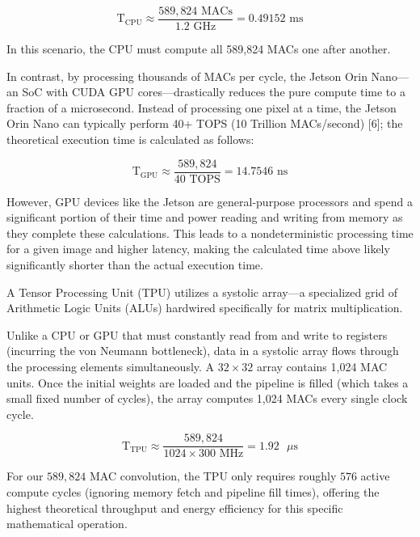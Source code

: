 \documentclass[11pt,a4paper,twoside]{article}
\begin{document}
\begin{equation}
\text{T}_{\text{CPU}} \approx \frac{589,824 \text{ MACs}}{1.2 \text{ GHz}} = 0.49152 \text{ ms}
\end{equation}

In this scenario, the CPU must compute all 589,824 MACs one after another.

In contrast, by processing thousands of MACs per cycle, the Jetson Orin Nano—an SoC with CUDA GPU cores—drastically reduces the pure compute time to a fraction of a microsecond. Instead of processing one pixel at a time, the Jetson Orin Nano can typically perform 40+ TOPS (10 Trillion MACs/second) [6]; the theoretical execution time is calculated as follows:

\begin{equation}
\text{T}_{\text{GPU}} \approx \frac{589,824}{40 \text{ TOPS}} = 14.7546 \text{ ns}
\end{equation}

However, GPU devices like the Jetson are general-purpose processors and spend a significant portion of their time and power reading and writing from memory as they complete these calculations. This leads to a nondeterministic processing time for a given image and higher latency, making the calculated time above likely significantly shorter than the actual execution time.

A Tensor Processing Unit (TPU) utilizes a systolic array—a specialized grid of Arithmetic Logic Units (ALUs) hardwired specifically for matrix multiplication. 

Unlike a CPU or GPU that must constantly read from and write to registers (incurring the von Neumann bottleneck), data in a systolic array flows through the processing elements simultaneously. A $32 \times 32$ array contains 1,024 MAC units. Once the initial weights are loaded and the pipeline is filled (which takes a small fixed number of cycles), the array computes 1,024 MACs every single clock cycle.

\begin{equation}
    \text{T}_{\text{TPU}} \approx \frac{589,824}{1024 \times 300\text{ MHz}} = 1.92 \text{ $\mu$s}
\end{equation}

For our $589,824$ MAC convolution, the TPU only requires roughly $576$ active compute cycles (ignoring memory fetch and pipeline fill times), offering the highest theoretical throughput and energy efficiency for this specific mathematical operation.
\end{document}
